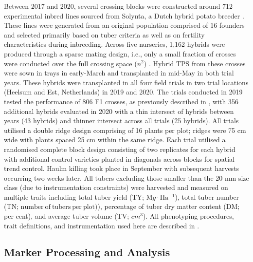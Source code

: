 \begin{refsection}
Between 2017 and 2020, several crossing blocks were constructed around 712 experimental inbred lines sourced from Solynta, a Dutch hybrid potato breeder \parencite{Lindhout2018}. These lines were generated from an original population comprised of 16 founders and selected primarily based on tuber criteria as well as on fertility characteristics during inbreeding. Across five nurseries, 1,162 hybrids were produced through a sparse mating design, i.e., only a small fraction of crosses were conducted over the full crossing space (\(n^2\)) \parencite{Wang2020}. Hybrid TPS from these crosses were sown in trays in early-March and transplanted in mid-May in both trial years. These hybrids were transplanted in all four field trials in two trial locations (Heelsum and Est, Netherlands) in 2019 and 2020. The trials conducted in 2019 tested the performance of 806 F1 crosses, as previously described in \parencite{Adams2022}, with 356 additional hybrids evaluated in 2020 with a thin intersect of hybrids between years (43 hybrids) and thinner intersect across all trials (25 hybrids). All trials utilised a double ridge design comprising of 16 plants per plot; ridges were 75 cm wide with plants spaced 25 cm within the same ridge. Each trial utilised a randomised complete block design consisting of two replicates for each hybrid with additional control varieties planted in diagonals across blocks for spatial trend control. Haulm killing took place in September with subsequent harvests occurring two weeks later. All tubers excluding those smaller than the 20 mm size class (due to instrumentation constraints) were harvested and measured on multiple traits including total tuber yield (TY; \(\mathrm Mg \cdot \mathrm{Ha^{-1}}\)), total tuber number (TN; \(\mathrm{number~of~tubers~per~plot)}\)), percentage of tuber dry matter content (DM; per cent), and average tuber volume (TV; \(cm^3\)). All phenotyping procedures, trait definitions, and instrumentation used here are described in \parencite{Stockem2020}.

\subsection{Marker Processing and Analysis}


\end{refsection}

